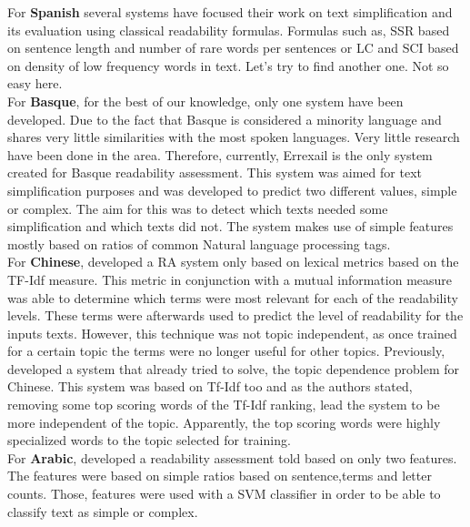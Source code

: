 \documentclass[12pt]{article}
\begin{document}
For \textbf{Spanish} several systems\cite{vstajner2013readability}\cite{drndarevic2013automatic} have focused their work on text simplification and its evaluation using classical readability formulas. Formulas such as, SSR \cite{spaulding1956spanish} based on sentence length and number of rare words per sentences or LC and SCI \cite{anula2007tipos} based on density of low frequency words in text. {\color{red} Let's try to find another one. Not so easy here.} \\


For \textbf{Basque}, for the best of our knowledge, only one system have been developed. Due to the fact that Basque is considered a minority language and shares very little similarities with the most spoken languages. Very little research have been done in the area. Therefore, currently, Errexail \cite{gonzalez2014simple} is the only system created for Basque readability assessment. This system was aimed for text simplification purposes and was developed to predict two different values, simple or complex. The aim for this was to detect which texts needed some simplification and which texts did not. The system makes use of simple features mostly based on ratios of common Natural language processing tags.\\



For \textbf{Chinese}, \cite{chen2011chinese} developed a RA system only based on lexical metrics based on the TF-Idf measure. This metric in conjunction with a mutual information measure was able to determine which terms were most relevant for each of the readability levels. These terms were afterwards used to predict the level of readability for the inputs texts. However, this technique was not topic independent, as once trained for a certain topic the terms were no longer useful for other topics. Previously, \cite{collins2004language} developed a system that already tried to solve, the topic dependence problem for Chinese. This system was based on Tf-Idf too and as the authors stated, removing some top scoring words of the Tf-Idf ranking, lead the system to be more independent of the topic. Apparently, the top scoring words were highly specialized words to the topic selected for training.\\

For \textbf{Arabic}, \cite{al2008towards} developed a readability assessment told based on only two features. The features were based on simple ratios based on sentence,terms and letter counts. Those, features were used with a SVM classifier in order to be able to classify text as simple or complex.\\
\end{document}
